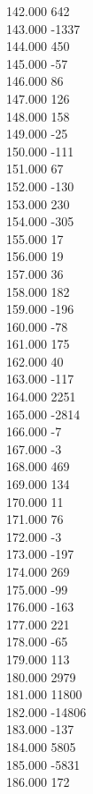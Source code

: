 { 142.000	642 \\
 143.000	-1337 \\
 144.000	450 \\
 145.000	-57 \\
 146.000	86 \\
 147.000	126 \\
 148.000	158 \\
 149.000	-25 \\
 150.000	-111 \\
 151.000	67 \\
 152.000	-130 \\
 153.000	230 \\
 154.000	-305 \\
 155.000	17 \\
 156.000	19 \\
 157.000	36 \\
 158.000	182 \\
 159.000	-196 \\
 160.000	-78 \\
 161.000	175 \\
 162.000	40 \\
 163.000	-117 \\
 164.000	2251 \\
 165.000	-2814 \\
 166.000	-7 \\
 167.000	-3 \\
 168.000	469 \\
 169.000	134 \\
 170.000	11 \\
 171.000	76 \\
 172.000	-3 \\
 173.000	-197 \\
 174.000	269 \\
 175.000	-99 \\
 176.000	-163 \\
 177.000	221 \\
 178.000	-65 \\
 179.000	113 \\
 180.000	2979 \\
 181.000	11800 \\
 182.000	-14806 \\
 183.000	-137 \\
 184.000	5805 \\
 185.000	-5831 \\
 186.000	172 \\
}

